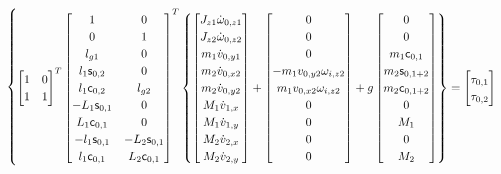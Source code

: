 \begin{itemize}
\begin{equation}
\begin{cases}
\begin{bmatrix}
1 & 0 \\
1 & 1 \\
\end{bmatrix}^T
\begin{bmatrix}
 1 & 0 \\
 0 & 1 \\
 l_{g1} & 0 \\
 l_1 \mathsf{s}_{0,2} & 0 \\
 l_1 \mathsf{c}_{0,2} & l_{g2} \\
 -L_1 \mathsf{s}_{0,1} & 0 \\
 L_1 \mathsf{c}_{0,1} & 0 \\
 -l_1 \mathsf{s}_{0,1} & -L_2 \mathsf{s}_{0,1} \\
 l_1 \mathsf{c}_{0,1} & L_2 \mathsf{c}_{0,1} \\
\end{bmatrix}^T
\begin{Bmatrix}
	\begin{bmatrix}
	J_{z1} \dot{\omega}_{0,z1} \\
	J_{z2} \dot{\omega}_{0,z2} \\
	m_1 \dot{v}_{0,y1} \\
	m_2 \dot{v}_{0,x2} \\
	m_2 \dot{v}_{0,y2} \\
	M_1 \dot{v}_{1,x} \\
	M_1 \dot{v}_{1,y} \\
	M_2 \dot{v}_{2,x} \\
	M_2 \dot{v}_{2,y} \\
	\end{bmatrix}
	+
	\begin{bmatrix}
	0 \\
	0 \\
	0 \\
	- m_1 v_{0,y2} \omega_{i,z2} \\
	  m_1 v_{0,x2} \omega_{i,z2} \\
	0 \\
	0 \\
	0 \\
	0 \\
	\end{bmatrix}
	+
	g \begin{bmatrix}
	0 \\
	0 \\
	m_1 \mathsf{c}_{0,1} \\
	m_2 \mathsf{s}_{0,1+2} \\
	m_2 \mathsf{c}_{0,1+2} \\
	0 \\
	M_1 \\
	0 \\
	M_2 \\
	\end{bmatrix}
\end{Bmatrix}
=
\begin{bmatrix}
\tau_{0,1} \\
\tau_{0,2}
\end{bmatrix} \\


\end{cases}
\end{equation}
\end{itemize}

